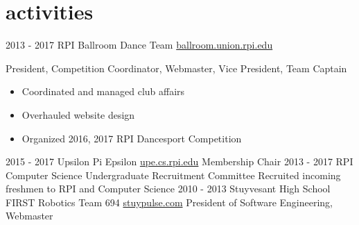 \documentclass[]{friggeri-cv}
\begin{document}
\section{activities}

\begin{entrylist}
  \entry
    {2013 - 2017}
    {RPI Ballroom Dance Team}
    {\href{http://ballroom.union.rpi.edu}{ballroom.union.rpi.edu}}
    {President, Competition Coordinator, Webmaster, Vice President, Team Captain
    \begin{itemize}
        \item Coordinated and managed club affairs
        \item Overhauled website design
        \item Organized 2016, 2017 RPI Dancesport Competition
    \end{itemize}
    }
  \entry
    {2015 - 2017}
    {Upsilon Pi Epsilon}
    {\href{http://upe.cs.rpi.edu}{upe.cs.rpi.edu}}
    {Membership Chair}
  \entry
    {2013 - 2017}
    {RPI Computer Science Undergraduate Recruitment Committee}
    {}
    {Recruited incoming freshmen to RPI and Computer Science}
  \entry
    {2010 - 2013}
    {Stuyvesant High School FIRST Robotics Team 694}
    {\href{http://stuypulse.com}{stuypulse.com}}
    {President of Software Engineering, Webmaster}
\end{entrylist}
\end{document}
